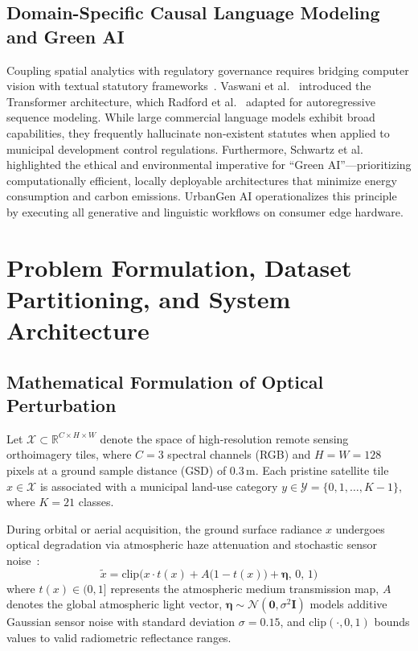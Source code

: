 \documentclass[journal]{IEEEtran}
\begin{document}
\subsection{Domain-Specific Causal Language Modeling and Green AI}
Coupling spatial analytics with regulatory governance requires bridging computer vision with textual statutory frameworks~\cite{batty2013new,benediktsson2015remote}. Vaswani et al.~\cite{vaswani2017attention} introduced the Transformer architecture, which Radford et al.~\cite{radford2019language} adapted for autoregressive sequence modeling. While large commercial language models exhibit broad capabilities, they frequently hallucinate non-existent statutes when applied to municipal development control regulations. Furthermore, Schwartz et al.~\cite{schwartz2020green} highlighted the ethical and environmental imperative for ``Green AI''---prioritizing computationally efficient, locally deployable architectures that minimize energy consumption and carbon emissions. UrbanGen AI operationalizes this principle by executing all generative and linguistic workflows on consumer edge hardware.

\section{Problem Formulation, Dataset Partitioning, and System Architecture}

\subsection{Mathematical Formulation of Optical Perturbation}
Let $\mathcal{X} \subset \mathbb{R}^{C \times H \times W}$ denote the space of high-resolution remote sensing orthoimagery tiles, where $C=3$ spectral channels (RGB) and $H=W=128$ pixels at a ground sample distance (GSD) of 0.3\,m. Each pristine satellite tile $x \in \mathcal{X}$ is associated with a municipal land-use category $y \in \mathcal{Y} = \{0, 1, \dots, K-1\}$, where $K=21$ classes.

During orbital or aerial acquisition, the ground surface radiance $x$ undergoes optical degradation via atmospheric haze attenuation and stochastic sensor noise~\cite{vincent2008extracting,zhang2017beyond}:
\begin{equation}
\tilde{x} = \text{clip}\Big(x \cdot t(x) + A\big(1 - t(x)\big) + \bm{\eta},\, 0,\, 1\Big)
\label{eq:degradation}
\end{equation}
where $t(x) \in (0, 1]$ represents the atmospheric medium transmission map, $A$ denotes the global atmospheric light vector, $\bm{\eta} \sim \mathcal{N}(\mathbf{0}, \sigma^2 \mathbf{I})$ models additive Gaussian sensor noise with standard deviation $\sigma = 0.15$, and $\text{clip}(\cdot, 0, 1)$ bounds values to valid radiometric reflectance ranges.
\end{document}
